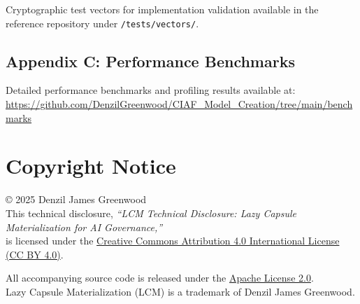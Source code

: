 \documentclass[12pt,a4paper]{article}
\begin{document}
Cryptographic test vectors for implementation validation available in the reference repository under \texttt{/tests/vectors/}.

\subsection*{Appendix C: Performance Benchmarks}

Detailed performance benchmarks and profiling results available at: \\
\url{https://github.com/DenzilGreenwood/CIAF_Model_Creation/tree/main/benchmarks}

\section*{Copyright Notice}

© 2025 Denzil James Greenwood \\
This technical disclosure, \textit{``LCM Technical Disclosure: Lazy Capsule Materialization for AI Governance,''} \\
is licensed under the \href{https://creativecommons.org/licenses/by/4.0/}{Creative Commons Attribution 4.0 International License (CC BY 4.0)}.

All accompanying source code is released under the \href{https://www.apache.org/licenses/LICENSE-2.0}{Apache License 2.0}. \\
Lazy Capsule Materialization (LCM)\texttrademark{} is a trademark of Denzil James Greenwood.
\end{document}
